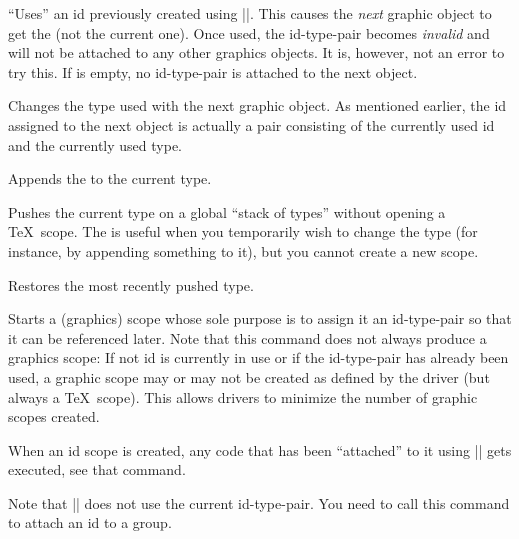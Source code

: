 \begin{command}{\pgfsys@use@id{}}
    ``Uses'' an id previously created using |\pgfsys@new@id|. This causes the
    \emph{next} graphic object to get the  (not the current one). Once
    used, the id-type-pair becomes \emph{invalid} and will not be attached to
    any other graphics objects. It is, however, not an error to try this. If
     is empty, no id-type-pair is attached to the next object.
\end{command}

\begin{command}{\pgfsys@use@type{}}
    Changes the type used with the next graphic object. As mentioned earlier,
    the id assigned to the next object is actually a pair consisting of the
    currently used id and the currently used type.
\end{command}

\begin{command}{\pgfsys@append@type{}}
    Appends the  to the current type.
\end{command}

\begin{command}{\pgfsys@push@type}
    Pushes the current type on a global ``stack of types'' without opening a
    \TeX\ scope. The is useful when you temporarily wish to change the type
    (for instance, by appending something to it), but you cannot create a new
    scope.
\end{command}

\begin{command}{\pgfsys@pop@type}
    Restores the most recently pushed type.
\end{command}

\begin{command}{\pgfsys@begin@idscope}
    Starts a (graphics) scope whose sole purpose is to assign it an
    id-type-pair so that it can be referenced later. Note that this command
    does not always produce a graphics scope: If not id is currently in use or
    if the id-type-pair has already been used, a graphic scope may or may not
    be created as defined by the driver (but always a \TeX\ scope). This allows
    drivers to minimize the number of graphic scopes created.

    When an id scope is created, any code that has been ``attached'' to it
    using |\pgfsys@attach@to@id| gets executed, see that command.

    Note that |\pgfsys@beginscope| does not use the current id-type-pair. You
    need to call this command to attach an id to a group.
\end{command}

